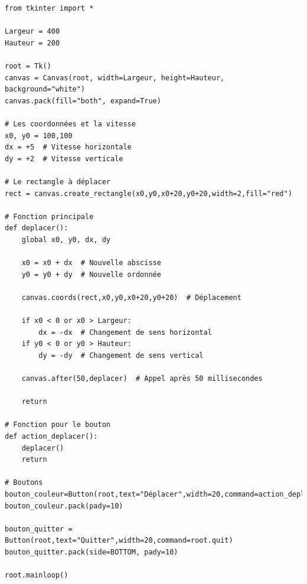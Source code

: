 \documentclass[11pt,class=report,crop=false]{standalone}
\begin{document}
\begin{lstlisting}
from tkinter import *

Largeur = 400
Hauteur = 200

root = Tk()     
canvas = Canvas(root, width=Largeur, height=Hauteur, background="white")
canvas.pack(fill="both", expand=True)

# Les coordonnées et la vitesse
x0, y0 = 100,100
dx = +5  # Vitesse horizontale
dy = +2  # Vitesse verticale

# Le rectangle à déplacer
rect = canvas.create_rectangle(x0,y0,x0+20,y0+20,width=2,fill="red")

# Fonction principale
def deplacer():
    global x0, y0, dx, dy

    x0 = x0 + dx  # Nouvelle abscisse
    y0 = y0 + dy  # Nouvelle ordonnée

    canvas.coords(rect,x0,y0,x0+20,y0+20)  # Déplacement

    if x0 < 0 or x0 > Largeur:
        dx = -dx  # Changement de sens horizontal
    if y0 < 0 or y0 > Hauteur:
        dy = -dy  # Changement de sens vertical

    canvas.after(50,deplacer)  # Appel après 50 millisecondes
 
    return
    
# Fonction pour le bouton
def action_deplacer():
    deplacer()
    return

# Boutons
bouton_couleur=Button(root,text="Déplacer",width=20,command=action_deplacer)
bouton_couleur.pack(pady=10)

bouton_quitter = Button(root,text="Quitter",width=20,command=root.quit)
bouton_quitter.pack(side=BOTTOM, pady=10)

root.mainloop()
\end{lstlisting}
\end{document}
